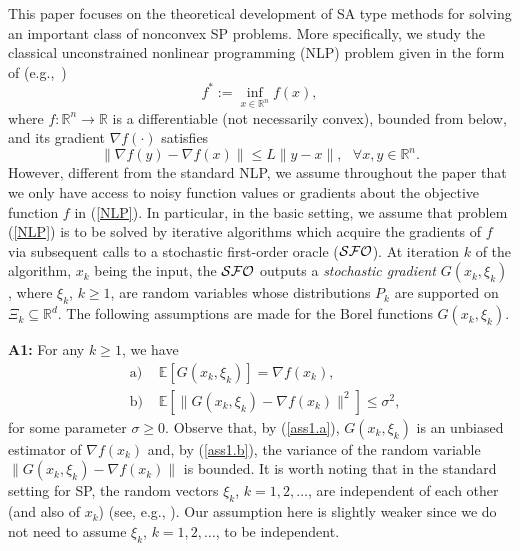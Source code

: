\documentclass[final]{siamltex}
\newcommand{\beq}{\begin{equation}}
\newcommand{\eeq}{\end{equation}}
\newcommand{\beqa}{\begin{eqnarray}}
\newcommand{\eeqa}{\end{eqnarray}}
\def\eqnok#1{(\ref{#1})}
\def\vgap{\vspace*{.1in}}
\newcommand{\bbe}{\mathbb{E}}
\newcommand{\bbr}{\mathbb{R}}
\def\SFO{{\cal SFO}}
\begin{document}
This paper focuses on the theoretical development of SA type methods for solving an important class of
nonconvex SP problems. More specifically, we study the classical unconstrained nonlinear programming (NLP) problem
given in the form of
(e.g.,~\cite{Nest04,NocWri99})
\beq \label{NLP}
f^* := \inf_{x \in \bbr^n} f(x),
\eeq
where $f:\bbr^n \to \bbr$ is a differentiable (not necessarily convex),
bounded from below, and its gradient $\nabla f(\cdot)$ satisfies
\[
\|\nabla f(y) - \nabla f(x)\| \le L\|y-x\|, \ \ \
\forall x, y \in \bbr^n.
\]
However, different from the standard NLP, we assume throughout the paper that
we only have access to noisy function values or gradients about the objective function $f$
in \eqnok{NLP}. In particular, in the basic setting, we assume that problem \eqnok{NLP} is to be solved by iterative algorithms
which acquire the gradients of $f$ via subsequent calls to a stochastic first-order
oracle ($\SFO$). At iteration $k$ of the algorithm, $x_k$ being the input,
the $\SFO$ outputs a {\sl stochastic gradient} $G(x_k, \xi_k)$, where
$\xi_k$, $k \ge 1$, are random variables whose distributions $P_k$ are supported on $\Xi_k \subseteq \bbr^d$.
The following assumptions are made for the Borel functions $G(x_k, \xi_k)$.

\vgap

{\bf A1:} For any $k \ge 1$, we have
\beqa
&\mbox{a)}& \, \, \bbe [G(x_k, \xi_k)] = \nabla f(x_k), \label{ass1.a} \\
&\mbox{b)} & \, \, \bbe \left[ \|G(x_k, \xi_k) - \nabla f(x_k)\|^2 \right] \le \sigma^2, \label{ass1.b}
\eeqa
for some parameter $\sigma \ge 0$.
Observe that, by \eqnok{ass1.a}, $G(x_k, \xi_k)$ is an unbiased estimator of $\nabla f(x_k)$
and, by \eqnok{ass1.b}, the variance of the random variable $\|G(x_k, \xi_k) - \nabla f(x_k)\|$ is bounded.
It is worth noting that in the standard setting for SP,
the random vectors $\xi_k$, $k = 1,2, \ldots$, are independent of each other 
(and also of $x_k$) (see, e.g., \cite{nemyud:83,NJLS09-1}). 
Our assumption here is slightly weaker since we do not need to assume  $\xi_k$, $k = 1,2, \ldots$, to be independent.

\end{document}
